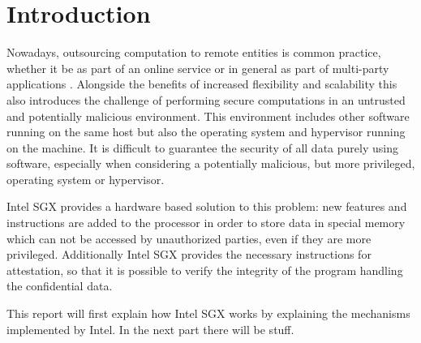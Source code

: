\section{Introduction} \label{sec:introduction}
Nowadays, outsourcing computation to remote entities is common practice, whether it be as part of an online service or 
in general as part of multi-party applications \cite{UseOfIntelSGX}. 
Alongside the benefits of increased flexibility and scalability this also introduces the challenge of performing secure 
computations in an untrusted and potentially malicious environment. 
This environment includes other software running on the same host but also the operating system and hypervisor running
on the machine.
It is difficult to guarantee the security of all data purely using software, especially when considering a potentially 
malicious, but more privileged, operating system or hypervisor.

Intel SGX provides a hardware based solution to this problem: new features and instructions are added to the processor
in order to store data in special memory which can not be accessed by unauthorized parties, even if they are more
privileged. Additionally Intel SGX provides the necessary instructions for attestation, so that it is possible to
verify the integrity of the program handling the confidential data.

This report will first explain how Intel SGX works by explaining the mechanisms implemented by Intel. In the next
part there will be stuff.
